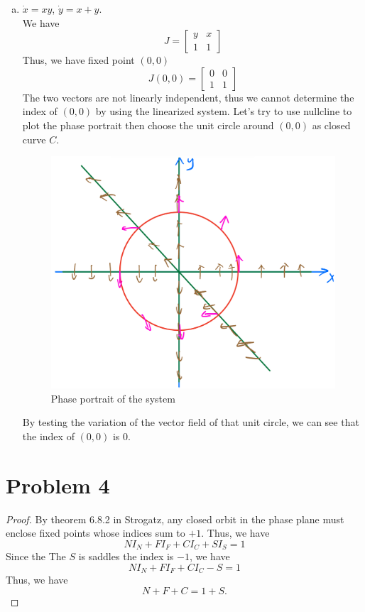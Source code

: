 \documentclass[12pt]{exam}
\begin{document}
\begin{enumerate}[(a)]
	\item $\dot{x} = xy$, $\dot{y} = x+y$. \\
		We have
		\[ J = \begin{bmatrix} y & x \\ 1 & 1 \end{bmatrix} \]
		Thus, we have fixed point $(0, 0)$
		\[ J(0, 0) = \begin{bmatrix} 0 & 0 \\ 1 & 1 \end{bmatrix} \]
		The two vectors are not linearly independent, thus we cannot determine the index of $(0, 0)$ by using the linearized system. Let's try to use nullcline to plot the phase portrait then choose the unit circle around $(0, 0)$ as closed curve $C$. 
		\begin{figure}[H]
			\centering
			\includegraphics[width=0.7\linewidth]{3c.jpeg}
			\caption{Phase portrait of the system}
		\end{figure}
		By testing the variation of the vector field of that unit circle, we can see that the index of $(0, 0)$ is $0$.
\end{enumerate}

\section*{Problem 4}
\begin{proof}
By theorem 6.8.2 in Strogatz, any closed orbit in the phase plane must enclose fixed points whose indices sum to $+1$. Thus, we have
\[NI_N + FI_F+ CI_C + SI_S = 1\]
Since the The $S$ is saddles the index is $-1$, we have
\[NI_N + FI_F+ CI_C -S = 1\]
Thus, we have
\[N + F + C = 1+ S.\]

\end{proof}
\end{document}
